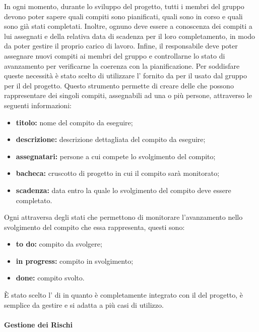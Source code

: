 \begin{itemize}
			In ogni momento, durante lo sviluppo del progetto, tutti i membri del gruppo devono poter sapere quali compiti sono pianificati, quali sono in corso e quali sono già stati completati. Inoltre, ognuno deve essere a conoscenza dei compiti a lui assegnati e della relativa data di scadenza per il loro completamento, in modo da poter gestire il proprio carico di lavoro. Infine, il responsabile deve poter assegnare nuovi compiti ai membri del gruppo e controllarne lo stato di avanzamento per verificarne la coerenza con la pianificazione. 
			\newline
			Per soddisfare queste necessità è stato scelto di utilizzare l' fornito da  per il  usato dal gruppo per il  del progetto.
			\newline
			Questo strumento permette di creare delle  che possono rappresentare dei singoli compiti, assegnabili ad una o più persone, attraverso le seguenti informazioni:
			\begin{itemize}
				\item \textbf{titolo:} nome del compito da eseguire;
				\item \textbf{descrizione:} descrizione dettagliata del compito da eseguire;
				\item \textbf{assegnatari:} persone a cui compete lo svolgimento del compito;
				\item \textbf{bacheca:} cruscotto di progetto in cui il compito sarà monitorato;
				\item \textbf{scadenza:} data entro la quale lo svolgimento del compito deve essere completato. 
			\end{itemize}
			Ogni  attraversa degli stati che permettono di monitorare l'avanzamento nello svolgimento del compito che essa rappresenta, questi sono:
			\begin{itemize}
				\item \textbf{to do:} compito da svolgere;
				\item \textbf{in progress:} compito in svolgimento;
				\item \textbf{done:} compito svolto.
			\end{itemize}
			È stato scelto l' di  in quanto è completamente integrato con il  del progetto, è semplice da gestire e si adatta a più casi di utilizzo.
			
		\paragraph{Gestione dei Rischi}
			

\end{itemize}
